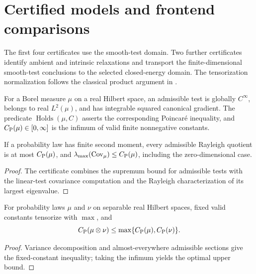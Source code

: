 \chapter{Certified models and frontend comparisons}
\label{chap:certified-models}

The first four certificates use the smooth-test domain. Two further certificates
identify ambient and intrinsic relaxations and transport the finite-dimensional smooth-test conclusions
to the selected closed-energy domain.  The tensorization normalization follows the classical
product argument in \cite{BakryGentilLedoux2014}.

\begin{definition}
  \label{def:legacy-smooth-test-poincare}
  \leanok
  For a Borel measure $\mu$ on a real Hilbert space, an admissible test is globally $C^\infty$,
  belongs to real $L^2(\mu)$, and has integrable squared canonical gradient.  The predicate
  $\operatorname{Holds}(\mu,C)$ asserts the corresponding Poincar\'e inequality, and
  $C_{\mathrm P}(\mu)\in[0,\infty]$ is the infimum of valid finite nonnegative constants.
\end{definition}

\begin{theorem}
  \label{cert:linear-test-lower}
  \leanok
  If a probability law has finite second moment, every admissible Rayleigh quotient is at most
  $C_{\mathrm P}(\mu)$, and $\lambda_{\max}(\operatorname{Cov}_\mu)\le C_{\mathrm P}(\mu)$, including the zero-dimensional case.
\end{theorem}
\begin{proof}
  \leanok
  The certificate combines the supremum bound for admissible tests with the linear-test
  covariance computation and the Rayleigh characterization of its largest eigenvalue.
\end{proof}

\begin{theorem}
  \label{cert:binary-tensorization}
  \leanok
  For probability laws $\mu$ and $\nu$ on separable real Hilbert spaces, fixed valid constants
  tensorize with $\max$, and
  \[
    C_{\mathrm P}(\mu\otimes\nu)\le\max\{C_{\mathrm P}(\mu),C_{\mathrm P}(\nu)\}.
  \]
\end{theorem}
\begin{proof}
  \leanok
  Variance decomposition and almost-everywhere admissible sections give the fixed-constant
  inequality; taking the infimum yields the optimal upper bound.
\end{proof}

